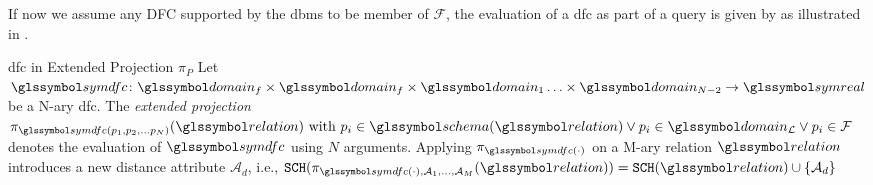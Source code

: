 If now we assume any DFC supported by the \acrshort{dbms} to be member of $\mathcal{F}$, the evaluation of a \acrshort{dfc} as part of a query is given by  as illustrated in .

\begin{definition}[label=definition:dfc_rel]{\acrlong{dfc} in Extended Projection $\pi_{P}$}{}
    Let $\symdfc \colon \domain_f \times \domain_f \times \domain_{1} \ldots \times \domain_{N-2} \to \symreal$ be a N-ary \acrshort{dfc}. The \emph{extended projection} $\pi_{\symdfc(p_1, p_2, \ldots p_N)}(\relation) \textrm { with } p_i \in \schema(\relation) \vee p_i \in \domain_{\mathcal{L}} \vee p_i \in \mathcal{F}$ denotes the evaluation of $\symdfc$ using $N$ arguments. Applying $\pi_{\symdfc(\cdot)}$ on a M-ary relation $\relation$ introduces a new distance attribute $\mathcal{A}_d$, i.e., $\mathtt{SCH}(\pi_{\symdfc(\cdot), \mathcal{A}_1, \ldots, \mathcal{A}_M}(\relation)) = \mathtt{SCH}(\relation) \cup \{ \mathcal{A}_d \}$
\end{definition}

